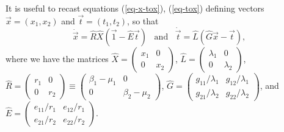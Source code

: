 It is useful to recast equations (\ref{eq-x-tox}), (\ref{eq-tox}) defining vectors $\vec{x}=(x_1,x_2)$ and $\vec{t}=(t_1,t_2)$, so that
\begin{equation}
\dot{\vec{x}} = \hat{R} \hat{X} \left( \vec{1} - \hat{E} \vec{t} \right)\;\;\;\text{and}\;\;\;
\dot{\vec{t}} = \hat{L} \left( \hat{G} \vec{x} - \vec{t} \right), \label{xdot-tdot-eqn}
\end{equation}
where we have the matrices $\hat{X} = \begin{pmatrix}
x_1 & 0 \\
0 & x_2
\end{pmatrix}$, $\hat{L} = \begin{pmatrix}
\lambda_1 & 0 \\
0 & \lambda_2
\end{pmatrix}$, $\hat{R} = \begin{pmatrix}
r_1 & 0 \\
0 & r_2
\end{pmatrix} \equiv \begin{pmatrix}
\beta_1-\mu_1 & 0 \\
0 & \beta_2-\mu_2
\end{pmatrix}$, $\hat{G} = \begin{pmatrix}
g_{11}/\lambda_1 & g_{12}/\lambda_1 \\
g_{21}/\lambda_2 & g_{22}/\lambda_2
\end{pmatrix}$, and $\hat{E} = \begin{pmatrix}
e_{11}/r_1 & e_{12}/r_1 \\
e_{21}/r_2 & e_{22}/r_2
\end{pmatrix}$.

